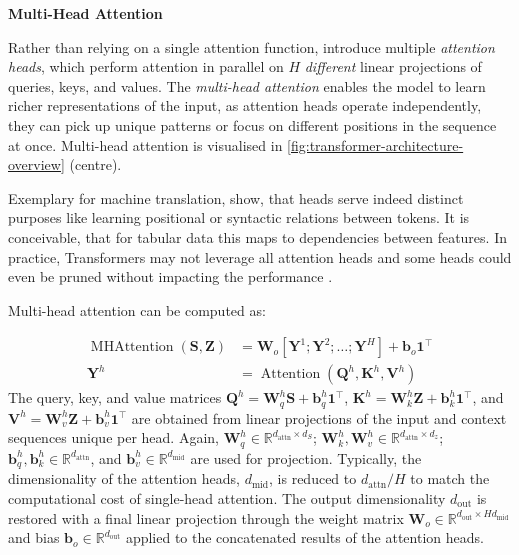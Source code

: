\textbf{Multi-Head Attention}

Rather than relying on a single attention function, \textcite[][4--5]{vaswaniAttentionAllYou2017} introduce multiple \emph{attention heads}, which perform attention in parallel on $H$ \emph{different} linear projections of queries, keys, and values. The \emph{multi-head attention} enables the model to learn richer representations of the input, as attention heads operate independently, they can pick up unique patterns or focus on different positions in the sequence at once. Multi-head attention is visualised in \cref{fig:transformer-architecture-overview} (centre).

Exemplary for machine translation, \textcite[][5795]{voitaAnalyzingMultiHeadSelfAttention2019} show, that heads serve indeed distinct purposes like learning positional or syntactic relations between tokens. It is conceivable, that for tabular data this maps to dependencies between features. In practice, Transformers may not leverage all attention heads and some heads could even be pruned without impacting the performance \autocites[][9]{michelAreSixteenHeads2019}[][5805]{voitaAnalyzingMultiHeadSelfAttention2019}.

Multi-head attention can be computed as:

\begin{equation}
    \begin{aligned}
        \operatorname{MHAttention}(\mathbf{S}, \mathbf{Z}) & = \mathbf{W}_{o}\left[\mathbf{Y}^{1};\mathbf{Y}^{2};\ldots;\mathbf{Y}^{H} \right] + \mathbf{b}_{o}\mathbf{1}^{\top} \\
        \mathbf{Y}^{h}                                     & = \operatorname{Attention}(\mathbf{Q}^h, \mathbf{K}^h, \mathbf{V}^h)
    \end{aligned}
\end{equation}
The query, key, and value matrices  $\mathbf{Q}^{h}=\mathbf{W}^h_q \mathbf{S} + \mathbf{b}^h_q\mathbf{1}^{\top}$, $\mathbf{K}^{h}=\mathbf{W}_k^h \mathbf{Z} + \mathbf{b}_k^h\mathbf{1}^{\top}$, and $\mathbf{V}^{h}=\mathbf{W}_v^h \mathbf{Z} + \mathbf{b}_v^h\mathbf{1}^{\top}$ are obtained from linear projections of the input and context sequences unique per head. Again, $\mathbf{W}^{h}_{q} \in \mathbb{R}^{d_{\mathrm{attn}}\times d_{S}}$; $\mathbf{W}^{h}_{k}, \mathbf{W}^{h}_{v} \in \mathbb{R}^{d_{\mathrm{attn}}\times d_z}$; $\mathbf{b}^h_q, \mathbf{b}^h_k \in \mathbb{R}^{d_{\mathrm{attn}}}$, and $\mathbf{b}^h_v \in \mathbb{R}^{d_{\mathrm{mid}}}$ are used for projection. Typically, the dimensionality of the attention heads, $d_{\mathrm{mid}}$, is reduced to $d_{\mathrm{attn}}/H$ to match the computational cost of single-head attention. The output dimensionality $d_{\mathrm{out}}$ is restored with a final linear projection through the weight matrix $\mathbf{W}_{o} \in \mathbb{R}^{d_{\mathrm{out}}\times Hd_{\mathrm{mid}}}$ and bias $\mathbf{b}_o \in \mathbb{R}^{d_{\mathrm{out}}}$ applied to the concatenated results of the attention heads.

